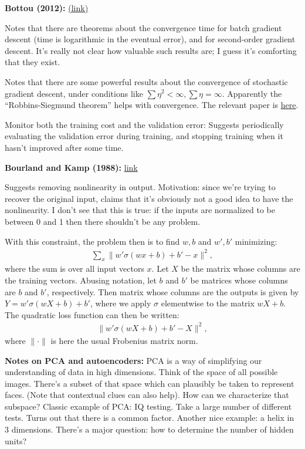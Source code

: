 \documentclass[12pt]{article}
\newcommand{\link}[2]{\href{#1}{#2}}
\begin{document}
\textbf{Bottou (2012):}
\link{http://leon.bottou.org/papers/bottou-tricks-2012}{(link)}

Notes that there are theorems about the convergence time for batch
gradient descent (time is logarithmic in the eventual error), and for
second-order gradient descent.  It's really not clear how valuable
such results are; I guess it's comforting that they exist.

Notes that there are some powerful results about the convergence of
stochastic gradient descent, under conditions like $\sum \eta^2 <
\infty, \sum \eta = \infty$.  Apparently the ``Robbins-Siegmund
theorem'' helps with convergence.  The relevant paper is
\link{http://scholar.google.ca/scholar?cluster=509989913518206088\&hl=en\&as\_sdt=0,5}{here}.

Monitor both the training cost and the validation error: Suggests
periodically evaluating the validation error during training, and
stopping training when it hasn't improved after some time.

\textbf{Bourland and Kamp (1988):}
\link{http://scholar.google.com/scholar?cluster=17784424506773259343\&hl=en\&as\_sdt=0,5}{link}

Suggests removing nonlinearity in output.  Motivation: since we're
trying to recover the original input, claims that it's obviously not a
good idea to have the nonlinearity.  I don't see that this is true: if
the inputs are normalized to be between 0 and 1 then there shouldn't
be any problem.

With this constraint, the problem then is to find $w, b$ and $w', b'$
minimizing:
\begin{eqnarray}
  \sum_x \|w' \sigma(wx+b)+b'-x\|^2,
\end{eqnarray}
where the sum is over all input vectors $x$.  Let $X$ be the matrix
whose columns are the training vectors.  Abusing notation, let $b$ and
$b'$ be matrices whose columns are $b$ and $b'$, respectively.  Then
matrix whose columns are the outputs is given by $Y =
w'\sigma(wX+b)+b'$, where we apply $\sigma$ elementwise to the
matrix $wX+b$.  The quadratic loss function can then be written:
\begin{eqnarray}
  \| w'\sigma(wX+b)+b'-X\|^2,
\end{eqnarray}
where $\|\cdot\|$ is here the usual Frobenius matrix norm.

\textbf{Notes on PCA and autoencoders:} PCA is a way of simplifying
our understanding of data in high dimensions.  Think of the space of
all possible images.  There's a subset of that space which can
plausibly be taken to represent faces.  (Note that contextual clues
can also help).  How can we characterize that subspace?  Classic
example of PCA: IQ testing.  Take a large number of different tests.
Turns out that there is a common factor.  Another nice example: a
helix in 3 dimensions.  There's a major question: how to determine the
number of hidden units?
\end{document}
